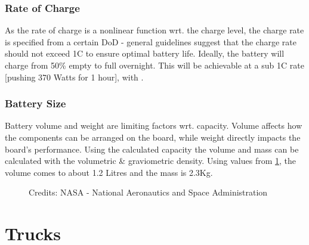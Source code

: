 \documentclass[journal,10pt]{IEEEtran}
\begin{document}
        \subsubsection{Rate of Charge}
            As the rate of charge is a nonlinear function wrt. the charge level, the charge rate is specified from a certain DoD - general guidelines suggest that the charge rate should not exceed 1C to ensure optimal battery life. Ideally, the battery will charge from 50\% empty to full overnight. This will be achievable at a sub 1C rate [pushing 370 Watts for 1 hour], with .
        \subsubsection{Battery Size}
        Battery volume and weight are limiting factors wrt. capacity. Volume affects how the components can be arranged on the board, while weight directly impacts the board's performance.    
        Using the calculated capacity the volume and mass can be calculated with the volumetric & graviometric density. Using values from \ref{fig:Battery Size}, the volume comes to about 1.2 Litres and the mass is 2.3Kg.
            \begin{figure}[H]
                \centering
                \caption{Credits: NASA - National Aeronautics and Space Administration}
                \label{fig:Battery Size}
            \end{figure}
\section{Trucks}
\end{document}

